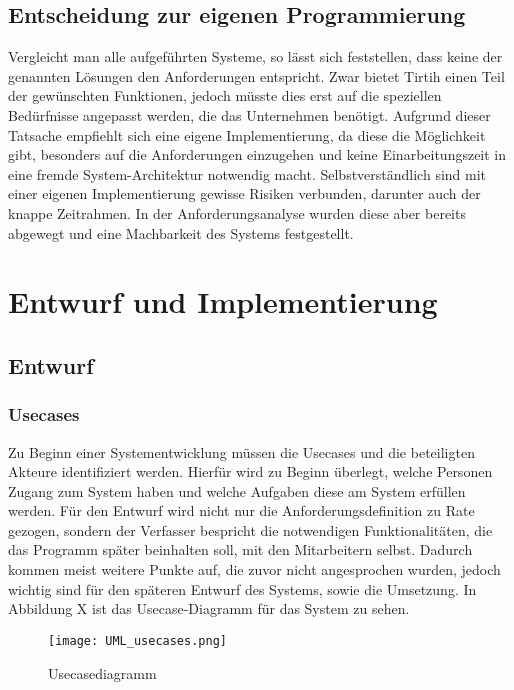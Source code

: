 \section{Entscheidung zur eigenen Programmierung}
\label{sec:decisionowncreating}

Vergleicht man alle aufgeführten Systeme, so lässt sich feststellen, dass keine der genannten Lösungen den Anforderungen entspricht.
Zwar bietet Tirtih einen Teil der gewünschten Funktionen, jedoch müsste dies erst auf die speziellen Bedürfnisse angepasst werden, die das Unternehmen benötigt.
Aufgrund dieser Tatsache empfiehlt sich eine eigene Implementierung, da diese die Möglichkeit gibt, besonders auf die Anforderungen einzugehen und keine Einarbeitungszeit in eine fremde System-Architektur notwendig macht.
Selbstverständlich sind mit einer eigenen Implementierung gewisse Risiken verbunden, darunter auch der knappe Zeitrahmen.
In der Anforderungsanalyse wurden diese aber bereits abgewegt und eine Machbarkeit des Systems festgestellt.

\chapter{Entwurf und Implementierung}
\label{cha:entw_imp}

\section{Entwurf}
\label{sec:Entwurf}


\subsection{Usecases}
\label{subsec:usecases}

Zu Beginn einer Systementwicklung müssen die Usecases und die beteiligten Akteure identifiziert werden.
Hierfür wird zu Beginn überlegt, welche Personen Zugang zum System haben und welche Aufgaben diese am System erfüllen werden.
Für den Entwurf wird nicht nur die Anforderungsdefinition zu Rate gezogen, sondern der Verfasser bespricht die notwendigen Funktionalitäten, die das Programm später beinhalten soll, mit den Mitarbeitern selbst.
Dadurch kommen meist weitere Punkte auf, die zuvor nicht angesprochen wurden, jedoch wichtig sind für den späteren Entwurf des Systems, sowie die Umsetzung.
In Abbildung X ist das Usecase-Diagramm für das System zu sehen.

\begin{figure}[H]
\centering
\texttt{[image: UML\_usecases.png]}
\caption{Usecasediagramm}
\label{fig:usecase001}
\end{figure}

